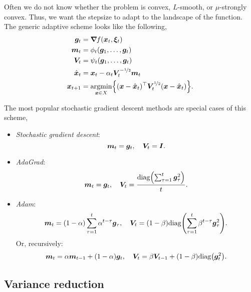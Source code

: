 Often we do not know whether the problem is convex, $L$-smooth, or $\mu$-strongly convex. Thus, we
want the stepsize to adapt to the landscape of the function. The generic adaptive scheme looks like
the following,
\begin{align*}
    \vec{g}_t       & = \grad{f(\vec{x}_t, \vec{\xi}_t)}{}                                                                                                     \\
    \vec{m}_t       & = \phi_t(\vec{g}_1, \ldots, \vec{g}_t)                                                                                                   \\
    \mat{V}_t       & = \psi_t(\vec{g}_1, \ldots, \vec{g}_t)                                                                                                   \\
    \hat{\vec{x}}_t & = \vec{x}_t - \alpha_t \mat{V}_t^{-\nicefrac{1}{2}} \vec{m}_t                                                                            \\
    \vec{x}_{t+1}   & = \argmin_{\vec{x} \in X} \lft\{ \transpose{(\vec{x} - \hat{\vec{x}}_t)} \mat{V}_t^{\nicefrac{1}{2}} (\vec{x} - \hat{\vec{x}}_t) \rgt\}.
\end{align*}

The most popular stochastic gradient descent methods are special cases of this scheme,
\begin{itemize}
    \item \textit{Stochastic gradient descent}: \[
              \bm{m}_t = \bm{g}_t, \quad \bm{V}_t = \bm{I}.
          \]
    \item \textit{AdaGrad}: \[
              \vec{m}_t = \vec{g}_t, \quad \mat{V}_t = \frac{\mathrm{diag}\lft( \sum_{\tau=1}^{t} \vec{g}_{\tau}^2 \rgt)}{t}.
          \]
    \item \textit{Adam}: \[
              \vec{m}_t = (1-\alpha) \sum_{\tau=1}^{t} \alpha^{t-\tau} \vec{g}_{\tau}, \quad \mat{V}_t = (1 - \beta) \mathrm{diag} \lft( \sum_{\tau=1}^{t} \beta^{t-\tau} \vec{g}_{\tau}^2 \rgt).
          \]
          Or, recursively: \[
              \vec{m}_t = \alpha \vec{m}_{t-1} + (1 - \alpha) \vec{g}_t, \quad \mat{V}_t = \beta \mat{V}_{t-1} + (1 - \beta) \mathrm{diag} \lft( \vec{g}_t^2 \rgt).
          \]
\end{itemize}

\subsection{Variance reduction}

